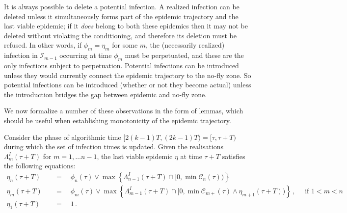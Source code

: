 \documentclass[]{article}
\newcommand{\Infections}{\mathcal{I}}
\newcommand{\Conditioned}{\mathcal{C}}
\begin{document}
 It is always possible to delete a potential infection.
 A realized infection can be deleted unless it simultaneously forms part of the epidemic trajectory and the last viable epidemic;
 if it \emph{does} belong to both these epidemics then it may not be deleted without violating the conditioning, and therefore its deletion must be refused. 
 In other words, if \(\phi_m=\eta_m\) for some \(m\), the (necessarily
 realized) infection in \(\Infections_{m-1}\) occurring at time \(\phi_m\) must be perpetuated, and these are the only infections subject to perpetuation.
 Potential infections can be introduced unless they would currently connect the epidemic trajectory to the no-fly zone.
 So potential infections can be introduced (whether or not they become
 actual) unless the introduction bridges the gap between epidemic and
 no-fly zone.
 
 
 We now formalize a number of these observations in the form of lemmas, which should be useful when establishing monotonicity of the epidemic trajectory.%

\begin{lem}\label{lem:update_last-viable}
	Consider the phase of algorithmic time \([2(k-1)T, (2k-1)T) = [\tau, \tau+T) \) during
	which the set of infection times is updated. Given the realisations \(\Lambda^I_m(\tau+T)\) for \(m=1,\dots n-1\), the last viable epidemic $\eta$ at time \(\tau+T\) satisfies the following equations: 
	\begin{align}
		\eta_n(\tau+T) \quad&=\quad \phi_n(\tau)\vee \max \left\{\Lambda^I_{n-1}(\tau+T) \cap [0, \min\Conditioned_{n}(\tau)) \right\} \nonumber \\
	 	\eta_m(\tau+T) \quad&=\quad \phi_m(\tau)\vee \max \left\{\Lambda^I_{m-1}(\tau+T) \cap [0, \min\Conditioned_{m+}(\tau)\wedge \eta_{m+1}(\tau+T)) \right\}\,, \quad \text{ if }1<m<n \label{eq:update_last-viable}\\
	 	\eta_1(\tau+T) \quad&=\quad 1 \nonumber \,.
	 \end{align}
\end{lem}
\end{document}
